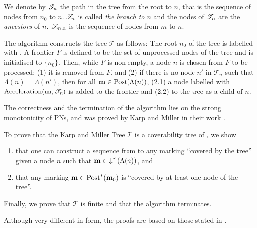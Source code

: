We denote by $\mathscr{T}_{n}$ the path in the tree from the root to $n$, that is the sequence of nodes from $n_0$ to $n$.
$\mathscr{T}_{n}$ is called \emph{the branch to $n$} and the nodes of $\mathscr{T}_{n}$ are the \emph{ancestors} of $n$.
$\mathscr{T}_{m,n}$ is the sequence of nodes from $m$ to $n$.

The algorithm constructs the tree $\mathcal{T}$ as follows:
The root $n_0$ of the tree is labelled with \mari.
A frontier $F$ is defined to be the set of unprocessed nodes of the tree and is initialised to $\{n_0\}$.
Then, while $F$ is non-empty, a node $n$ is chosen from $F$ to be processed:
(1) it is removed from $F$, and (2) if there is no node $n'$ in $\mathscr{T}_n$ such that $\Lambda(n) = \Lambda(n')$, then for all \omark $\mathbf{m} \in \operatorname{Post}(\Lambda(n))$, (2.1) a node labelled with $\operatorname{Acceleration}(\mathbf{m}, \mathscr{T}_n)$ is added to the frontier and (2.2) to the tree as a child of $n$.

The correctness and the termination of the algorithm lies on the strong monotonicity of \acp{PN}, and was proved by Karp and Miller in their work \cite{Karp69}.


To prove that the Karp and Miller Tree $\mathcal{T}$ is a coverability tree of \N, we show
\begin{enumerate}
  \item \todo{} that one can construct a sequence from \mari to any marking \mar “covered by the tree” given a node $n$ such that $\mathbf{m} \in \operatorname{\downarrow^\preceq}(\Lambda(n))$, and
  \item \todo{} that any marking $\mathbf{m} \in \operatorname{Post}^*(\mathbf{m}_0)$ is “covered by at least one node of the tree”.
\end{enumerate}

\todo{} Finally, we prove that $\mathcal{T}$ is finite and that the algorithm terminates.

Although very different in form, the proofs are based on those stated in \cite{Karp69}.

